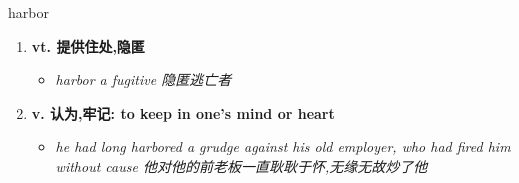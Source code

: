 
\begin{frame}
{\huge harbor}
\begin{center}
\begin{enumerate}\Large
  \item \textbf{vt. 提供住处,隐匿}
  \begin{itemize}
    \item \em{\Large{harbor a fugitive 隐匿逃亡者}}
  \end{itemize}
  \item \textbf{v. 认为,牢记: to keep in one's mind or heart}
  \begin{itemize}
    \item \em{\Large{he had long harbored a grudge against his old employer, who had fired him without cause 他对他的前老板一直耿耿于怀,无缘无故炒了他}}
  \end{itemize}
\end{enumerate}
\end{center}
\end{frame}
